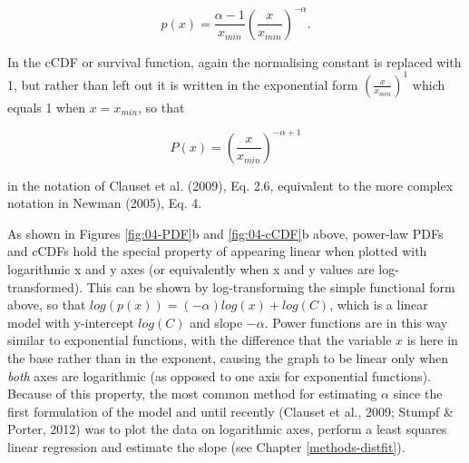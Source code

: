 \documentclass[
  12pt,
]{book}
\begin{document}
\begin{equation}
p(x) = \frac{\alpha-1}{x_{min}}(\frac{x}{x_{min}})^{-\alpha}.
\label{eq:power-law}
\end{equation}

In the cCDF or survival function, again the normalising constant is replaced with 1, but rather than left out it is written in the exponential form \((\frac{x}{x_{min}})^1\) which equals 1 when \(x = x_{min}\), so that

\begin{equation}
P(x) = (\frac{x}{x_{min}})^{-\alpha+1}
\label{eq:pareto}
\end{equation}

in the notation of Clauset et al. (2009), Eq. 2.6, equivalent to the more complex notation in Newman (2005), Eq. 4.

As shown in Figures \ref{fig:04-PDF}b and \ref{fig:04-cCDF}b above, power-law PDFs and cCDFs hold the special property of appearing linear when plotted with logarithmic x and y axes (or equivalently when x and y values are log-transformed). This can be shown by log-transforming the simple functional form above, so that \(log(p(x))=(-\alpha)log(x)+log(C)\), which is a linear model with y-intercept \(log(C)\) and slope \(-\alpha\). Power functions are in this way similar to exponential functions, with the difference that the variable \(x\) is here in the base rather than in the exponent, causing the graph to be linear only when \emph{both} axes are logarithmic (as opposed to one axis for exponential functions). Because of this property, the most common method for estimating \(\alpha\) since the first formulation of the model and until recently (Clauset et al., 2009; Stumpf \& Porter, 2012) was to plot the data on logarithmic axes, perform a least squares linear regression and estimate the slope (see Chapter \ref{methods-distfit}).
\end{document}
